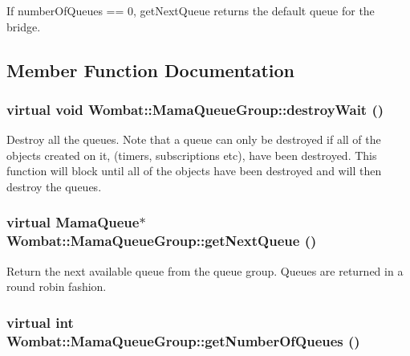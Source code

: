 If numberOfQueues == 0, getNextQueue returns the default queue for the bridge. 

\subsection{Member Function Documentation}
\hypertarget{classWombat_1_1MamaQueueGroup_a1fca2ac74bb5f6a211aba98149509e0d}{
\subsubsection[{destroyWait}]{\setlength{\rightskip}{0pt plus 5cm}virtual void Wombat::MamaQueueGroup::destroyWait ()}}
\label{classWombat_1_1MamaQueueGroup_a1fca2ac74bb5f6a211aba98149509e0d}


Destroy all the queues. Note that a queue can only be destroyed if all of the objects created on it, (timers, subscriptions etc), have been destroyed. This function will block until all of the objects have been destroyed and will then destroy the queues. \hypertarget{classWombat_1_1MamaQueueGroup_a4b1c1691e8b9c94ac5606bb6f64fc543}{
\subsubsection[{getNextQueue}]{\setlength{\rightskip}{0pt plus 5cm}virtual {\bf MamaQueue}$\ast$ Wombat::MamaQueueGroup::getNextQueue ()}}
\label{classWombat_1_1MamaQueueGroup_a4b1c1691e8b9c94ac5606bb6f64fc543}


Return the next available queue from the queue group. Queues are returned in a round robin fashion. \hypertarget{classWombat_1_1MamaQueueGroup_a8e5ffd601eaa994a2996b0d6ad9ca2ee}{
\subsubsection[{getNumberOfQueues}]{\setlength{\rightskip}{0pt plus 5cm}virtual int Wombat::MamaQueueGroup::getNumberOfQueues ()}}
\label{classWombat_1_1MamaQueueGroup_a8e5ffd601eaa994a2996b0d6ad9ca2ee}


